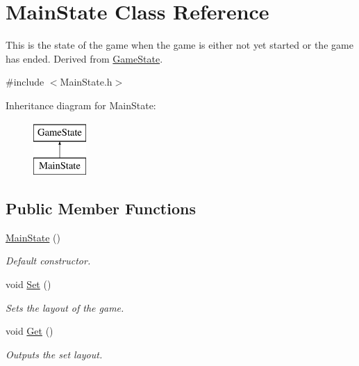 \hypertarget{classMainState}{\section{Main\-State Class Reference}
\label{classMainState}
}


This is the state of the game when the game is either not yet started or the game has ended. Derived from \hyperlink{classGameState}{Game\-State}.  




{\ttfamily \#include $<$Main\-State.\-h$>$}

Inheritance diagram for Main\-State\-:\begin{figure}[H]
\begin{center}
\leavevmode
\includegraphics[height=2.000000cm]{classMainState}
\end{center}
\end{figure}
\subsection*{Public Member Functions}
\begin{DoxyCompactItemize}
\item 
\hypertarget{classMainState_afc29557ba046813d1bff4aea2501b7f1}{\hyperlink{classMainState_afc29557ba046813d1bff4aea2501b7f1}{Main\-State} ()}\label{classMainState_afc29557ba046813d1bff4aea2501b7f1}

\begin{DoxyCompactList}\small\item\em Default constructor. \end{DoxyCompactList}\item 
\hypertarget{classMainState_ac01eced9d617c8c8f5382a9aa96adb45}{void \hyperlink{classMainState_ac01eced9d617c8c8f5382a9aa96adb45}{Set} ()}\label{classMainState_ac01eced9d617c8c8f5382a9aa96adb45}

\begin{DoxyCompactList}\small\item\em Sets the layout of the game. \end{DoxyCompactList}\item 
\hypertarget{classMainState_a23233e859905d025cfc031a12977a844}{void \hyperlink{classMainState_a23233e859905d025cfc031a12977a844}{Get} ()}\label{classMainState_a23233e859905d025cfc031a12977a844}

\begin{DoxyCompactList}\small\item\em Outputs the set layout. \end{DoxyCompactList}\end{DoxyCompactItemize}
